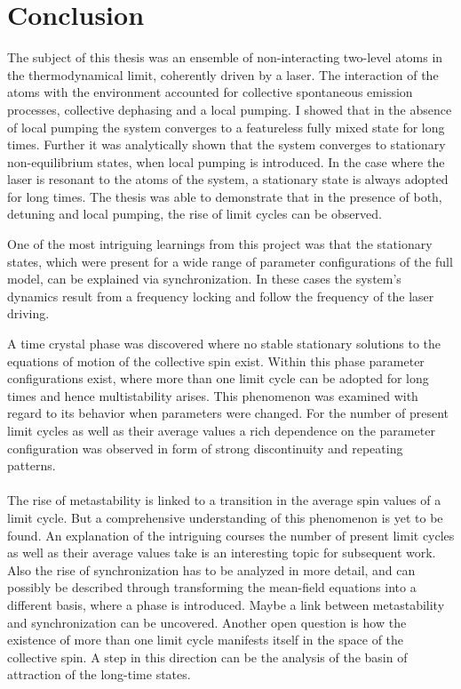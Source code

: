 \chapter{Conclusion}
The subject of this thesis was an ensemble of non-interacting two-level atoms in the thermodynamical limit, coherently driven by a laser. The interaction of the atoms with the environment accounted for collective spontaneous emission processes, collective dephasing and a local pumping. I showed that in the absence of local pumping the system converges to a featureless fully mixed state for long times. Further it was analytically shown that the system converges to stationary non-equilibrium states, when local pumping is introduced. In the case where the laser is resonant to the atoms of the system, a stationary state is always adopted for long times. The thesis was able to demonstrate that in the presence of both, detuning and local pumping, the rise of limit cycles can be observed.%

One of the most intriguing learnings from this project was that the stationary states, which were present for a wide range of parameter configurations of the full model, can be explained via synchronization. In these cases the system's dynamics result from a frequency locking and follow the frequency of the laser driving. 

A time crystal phase was discovered where no stable stationary solutions to the equations of motion of the collective spin exist. Within this phase parameter configurations exist, where more than one limit cycle can be adopted for long times and hence multistability arises. This phenomenon was examined with regard to its behavior when parameters were changed. For the number of present limit cycles as well as their average values a rich dependence on the parameter configuration was observed in form of strong discontinuity and repeating patterns.\\\\
The rise of metastability is linked to a transition in the average spin values of a limit cycle. But a comprehensive understanding of this phenomenon is yet to be found. An explanation of the intriguing courses the number of present limit cycles as well as their average values take is an interesting topic for subsequent work. Also the rise of synchronization has to be analyzed in more detail, and can possibly be described through transforming the mean-field equations into a different basis, where a phase is introduced. Maybe a link between metastability and synchronization can be uncovered. Another open question is how the existence of more than one limit cycle manifests itself in the space of the collective spin. A step in this direction can be the analysis of the basin of attraction of the long-time states.

